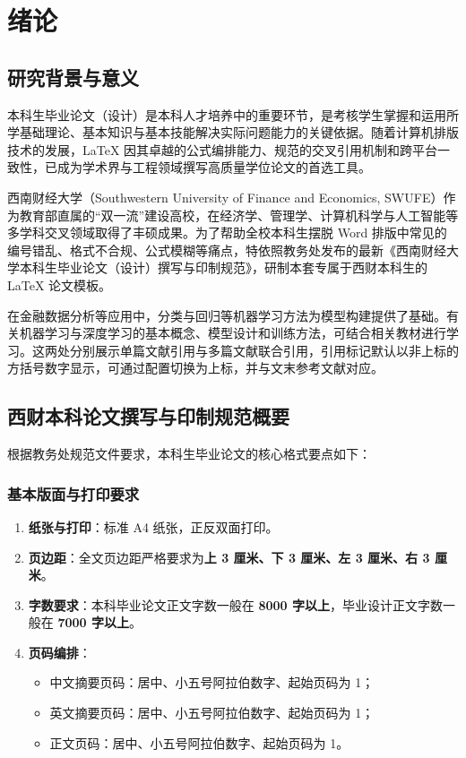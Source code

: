 
\chapter{绪论}

\section{研究背景与意义}

本科生毕业论文（设计）是本科人才培养中的重要环节，是考核学生掌握和运用所学基础理论、基本知识与基本技能解决实际问题能力的关键依据。随着计算机排版技术的发展，\LaTeX{} 因其卓越的公式编排能力、规范的交叉引用机制和跨平台一致性，已成为学术界与工程领域撰写高质量学位论文的首选工具。

西南财经大学（Southwestern University of Finance and Economics, SWUFE）作为教育部直属的“双一流”建设高校，在经济学、管理学、计算机科学与人工智能等多学科交叉领域取得了丰硕成果。为了帮助全校本科生摆脱 Word 排版中常见的编号错乱、格式不合规、公式模糊等痛点，特依照教务处发布的最新《西南财经大学本科生毕业论文（设计）撰写与印制规范》，研制本套专属于西财本科生的 \LaTeX{} 论文模板。

在金融数据分析等应用中，分类与回归等机器学习方法为模型构建提供了基础\cite{西瓜书}。有关机器学习与深度学习的基本概念、模型设计和训练方法，可结合相关教材进行学习\cite{西瓜书,深度学习图书}。这两处分别展示单篇文献引用与多篇文献联合引用，引用标记默认以非上标的方括号数字显示，可通过配置切换为上标，并与文末参考文献对应。

\section{西财本科论文撰写与印制规范概要}

根据教务处规范文件要求，本科生毕业论文的核心格式要点如下：

\subsection{基本版面与打印要求}
\begin{enumerate}
    \item \textbf{纸张与打印}：标准 A4 纸张，正反双面打印。
    \item \textbf{页边距}：全文页边距严格要求为\textbf{上 3 厘米、下 3 厘米、左 3 厘米、右 3 厘米}。
    \item \textbf{字数要求}：本科毕业论文正文字数一般在 \textbf{8000 字以上}，毕业设计正文字数一般在 \textbf{7000 字以上}。
    \item \textbf{页码编排}：
    \begin{itemize}
        \item 中文摘要页码：居中、小五号阿拉伯数字、起始页码为 1；
        \item 英文摘要页码：居中、小五号阿拉伯数字、起始页码为 1；
        \item 正文页码：居中、小五号阿拉伯数字、起始页码为 1。
    \end{itemize}
\end{enumerate}

